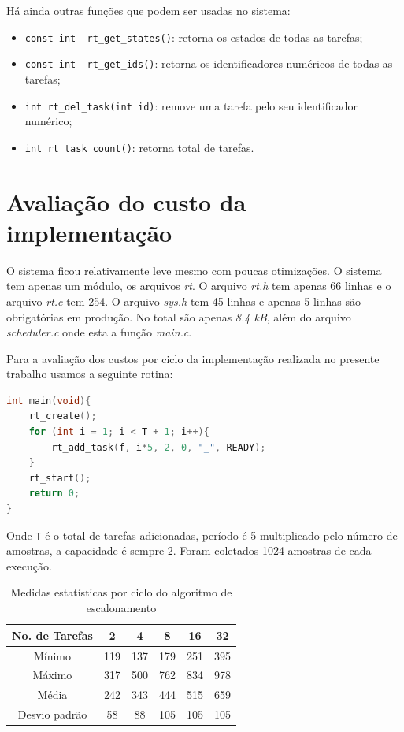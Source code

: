 \documentclass[a4 paper]{article}
\begin{document}
Há ainda outras funções que podem ser usadas no sistema:
\begin{itemize}
    \item \verb|const int  rt_get_states()|: retorna os estados de todas as tarefas;
    \item \verb|const int  rt_get_ids()|: retorna os identificadores numéricos de todas as tarefas;
    \item \verb|int rt_del_task(int id)|: remove uma tarefa pelo seu identificador numérico;
    \item \verb|int rt_task_count()|: retorna total de tarefas.
\end{itemize}

\section{Avaliação do custo da implementação}
O sistema ficou relativamente leve mesmo com poucas otimizações. O sistema tem apenas um módulo, os arquivos \textit{rt}. O arquivo \textit{rt.h} tem apenas 66 linhas e o arquivo \textit{rt.c} tem 254. O arquivo \textit{sys.h} tem 45 linhas e apenas 5 linhas são obrigatórias em produção. No total são apenas \textit{8.4 kB}, além do arquivo \textit{scheduler.c} onde esta a função \textit{main.c}.

Para a avaliação dos custos por ciclo da implementação realizada no presente trabalho usamos a seguinte rotina:

\begin{lstlisting}[captionpos=b, language=C, caption=Função \textit{main} da rotina de avaliaçào]
int main(void){
    rt_create();
    for (int i = 1; i < T + 1; i++){
        rt_add_task(f, i*5, 2, 0, "_", READY);
    }
    rt_start();
 	return 0;
}
\end{lstlisting}

Onde \verb|T| é o total de tarefas adicionadas, período é 5 multiplicado pelo número de amostras, a capacidade é sempre 2. Foram coletados 1024 amostras de cada execução.

\begin{table}[h!]
\begin{center}
\begin{tabular}{| c | c | c | c | c | c |}
 \hline
 No. de Tarefas & 2 & 4 & 8 & 16 & 32 \\
 \hline
 Mínimo & 119 & 137 & 179 & 251 & 395 \\
 Máximo & 317 & 500 & 762 & 834 & 978 \\
 Média & 242 & 343 & 444 & 515 & 659 \\
 Desvio padrão & 58 & 88 & 105 & 105 & 105 \\ 
 \hline
\end{tabular}
\caption{Medidas estatísticas por ciclo do algoritmo de escalonamento}
\end{center}
\end{table}
\end{document}
